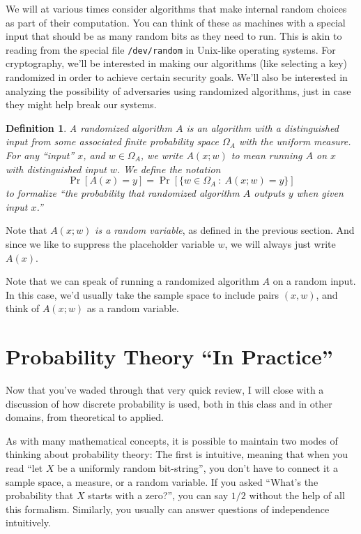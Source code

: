 \documentclass[11pt]{article}
\newtheorem{definition}{Definition}
\begin{document}
We will at various times consider algorithms that make internal random choices
as part of their computation. You can think of these as machines with a special
input that should be as many random bits as they need to run. This is akin to
reading from the special file \texttt{/dev/random} in Unix-like operating
systems. For cryptography, we'll be interested in making our algorithms (like
selecting a key) randomized in order to achieve certain security goals.  We'll
also be interested in analyzing the possibility of adversaries using randomized
algorithms, just in case they might help break our systems.

\begin{definition}
    A \emph{randomized algorithm $A$} is an algorithm with a distinguished
    input from some associated finite probability space $\Omega_A$ with the
    uniform measure.  For any ``input'' $x$, and $w\in\Omega_A$, we write 
    $A(x;w)$ to mean running $A$ on $x$ with distinguished input $w$.
    We define the notation
    \[
        \Pr[A(x) = y] = \Pr[\{w\in\Omega_A \ : \ A(x;w)=y\}]
    \]
    to formalize ``the probability that randomized algorithm $A$ outputs $y$
    when given input $x$.''
\end{definition}
Note that $A(x;w)$ \emph{is a random variable}, as defined in the previous
section.  And since we like to suppress the placeholder variable $w$, we will
always just write $A(x)$.

Note that we can speak of running a randomized algorithm $A$ on a random
input. In this case, we'd usually take the sample space to include pairs
$(x,w)$, and think of $A(x;w)$ as a random variable.

\section{Probability Theory ``In Practice''}

Now that you've waded through that very quick review, I will close with
a discussion of how discrete probability is used, both in this class and
in other domains, from theoretical to applied.

As with many mathematical concepts, it is possible to maintain two modes of
thinking about probability theory: The first is intuitive, meaning that when
you read ``let $X$ be a uniformly random bit-string'', you don't have to
connect it a sample space, a measure, or a random variable. If you asked
``What's the probability that $X$ starts with a zero?'', you can say $1/2$
without the help of all this formalism. Similarly, you usually can answer
questions of independence intuitively.
\end{document}

